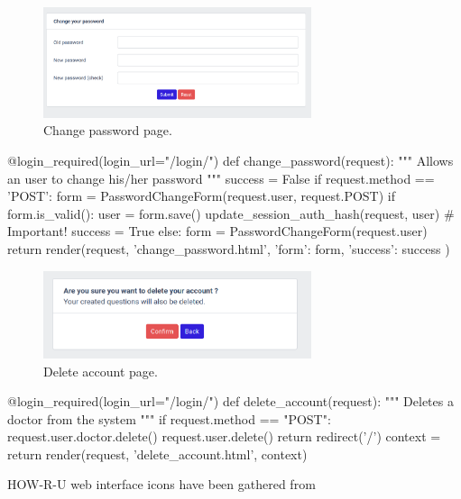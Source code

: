 \documentclass[12pt,english]{article}
\begin{document}
\begin{figure}[H]
    \centering
    \includegraphics[width=0.7\textwidth]{change_pwd.png}
    \caption{Change password page.}
\end{figure}

\begin{python}[caption={Method to change user's password}, captionpos=b]
@login_required(login_url="/login/")
def change_password(request):
    """
    Allows an user to change his/her password
    """
    success = False
    if request.method == 'POST':
        form = PasswordChangeForm(request.user, request.POST)
        if form.is_valid():
            user = form.save()
            update_session_auth_hash(request, user)  # Important!
            success = True
    else:
        form = PasswordChangeForm(request.user)
    return render(request, 'change_password.html', {
        'form': form,
        'success': success
    })
\end{python}


\begin{figure}[H]
    \centering
    \includegraphics[width=0.7\textwidth]{delete_account.png}
    \caption{Delete account page.}
\end{figure}


\begin{python}[caption={Method to delete an account}, captionpos=b]
@login_required(login_url="/login/")
def delete_account(request):
    """
    Deletes a doctor from the system
    """
    if request.method == "POST":
        request.user.doctor.delete()
        request.user.delete()
        return redirect('/')
    context = {}
    return render(request, 'delete_account.html', context)
\end{python}

HOW-R-U web interface icons have been gathered from \cite{pixabay}
\newpage
\end{document}
